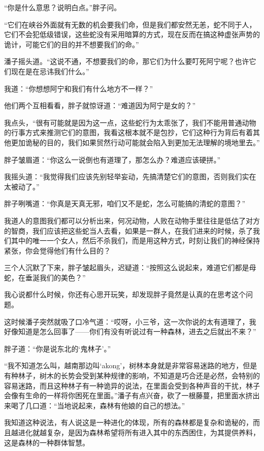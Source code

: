 “你是什么意思？说明白点。”胖子问。

“它们在峡谷外面就有无数的机会要我们命，但是我们都安然无恙，蛇不同于人，它们不会犯低级错误，这些蛇没有采用暗算的方式，现在反而在搞这种虚张声势的诡计，可能它们的目的并不想要我们的命。”

潘子摇头道。“这说不通，不想要我们的命，那它们为什么要叮死阿宁呢？也许它们现在是在忌讳我们什么。”

我道：“你想想阿宁和我们有什么地方不一样？”

他们两个互相看看，胖子就惊讶道：“难道因为阿宁是女的？”

我点头，“很有可能就是因为这一点，这些蛇行为太乖张了，我们不能用普通动物的行事方式来推测它们的意图，我看这根本就不是包抄，它们这种行为背后有着其他更加诡秘的目的，我们如果贸然行动可能就会陷入到更加无法理解的境地里去。”

胖子皱眉道：“你这么一说倒也有道理了，那怎么办？难道应该硬拼。”

我摇头道：“我觉得我们应该先别轻举妄动，先搞清楚它们的意图，否则我们实在太被动了。”

胖子咧嘴道：“你真是天真无邪，咱们又不是蛇，怎么可能搞的清蛇的意图？”

我道人的意图我们都可以分析出来，何况动物，人败在动物手里往往是低估了对方的智商，我们应该把这些蛇当人去看，如果是一群人，在我们进来的时候，杀了我们其中的唯一一个女人，然后不杀我们，而是用这种方式，时刻让我们的神经保持紧张，你会觉得他们有什么目的？

三个人沉默了下来，胖子皱起眉头，迟疑道：“按照这么说起来，难道它们都是母蛇，在垂涎我们的美色？”

我心说都什么时候，你还有心思开玩笑，却发现胖子竟然是认真的在思考这个问题。

这时候潘子突然就吸了口冷气道：“哎呀，小三爷，这一次你说的太有道理了，我好像知道是怎么回事了——你们有没有听说过有一种森林，进去之后就出不来？”

胖子道：“你是说东北的‘鬼林子’。”

“我不知道怎么叫，越南那边叫‘akong’，树林本身就是非常容易迷路的地方，但是有种林子，树木的长势会受到某种规律的影响，不知道是巧合还是必然，会特别的容易迷路，而且这种林子有一种诡异的说法，在里面会受到各种声音的干扰，林子会像有生命的一样将你困死在里面。”潘子有点兴奋，砍了一根藤蔓，把里面水挤出来喝了几口道：“当地说起来，森林有他娘的自己的想法。”

我知道这种说法，有人说这是一种进化的体现，所有的森林都是复杂和诡秘的，而且越进化就越复杂，是因为森林希望将所有进入其中的东西困住，为其提供养料，这是森林的一种群体智慧。

